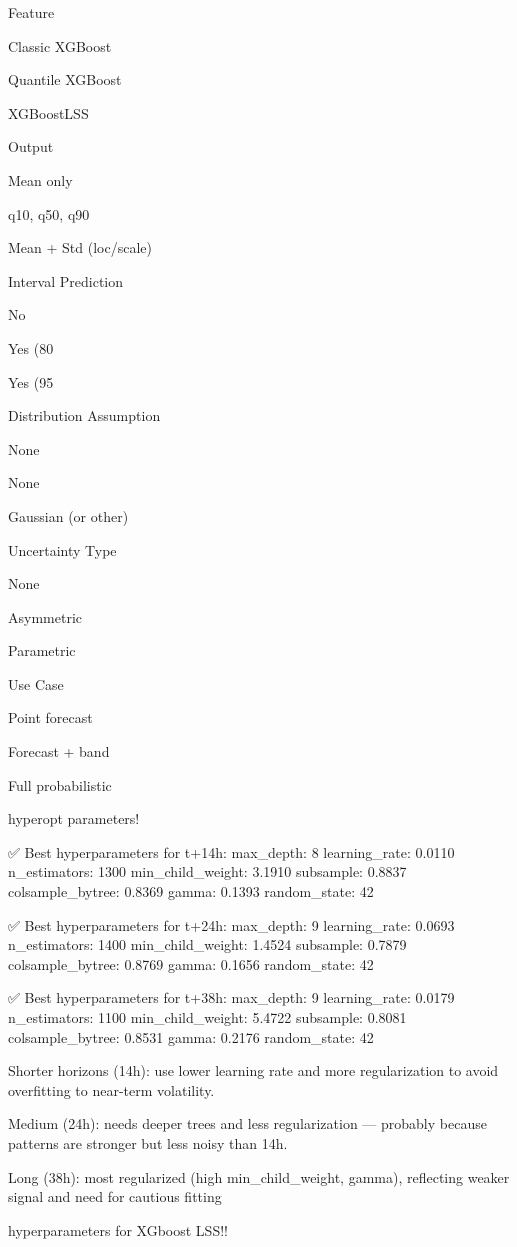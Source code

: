 Feature

Classic XGBoost

Quantile XGBoost

XGBoostLSS

Output

Mean only

q10, q50, q90

Mean + Std (loc/scale)

Interval Prediction

No

Yes (80%

Yes (95%

Distribution Assumption

None

None

Gaussian (or other)

Uncertainty Type

None

Asymmetric

Parametric

Use Case

Point forecast

Forecast + band

Full probabilistic



hyperopt parameters!

✅ Best hyperparameters for t+14h:
max_depth: 8
learning_rate: 0.0110
n_estimators: 1300
min_child_weight: 3.1910
subsample: 0.8837
colsample_bytree: 0.8369
gamma: 0.1393
random_state: 42

✅ Best hyperparameters for t+24h:
max_depth: 9
learning_rate: 0.0693
n_estimators: 1400
min_child_weight: 1.4524
subsample: 0.7879
colsample_bytree: 0.8769
gamma: 0.1656
random_state: 42

✅ Best hyperparameters for t+38h:
max_depth: 9
learning_rate: 0.0179
n_estimators: 1100
min_child_weight: 5.4722
subsample: 0.8081
colsample_bytree: 0.8531
gamma: 0.2176
random_state: 42

Shorter horizons (14h): use lower learning rate and more regularization to avoid overfitting to near-term volatility.

Medium (24h): needs deeper trees and less regularization — probably because patterns are stronger but less noisy than 14h.

Long (38h): most regularized (high min_child_weight, gamma), reflecting weaker signal and need for cautious fitting


hyperparameters for XGboost LSS!!

